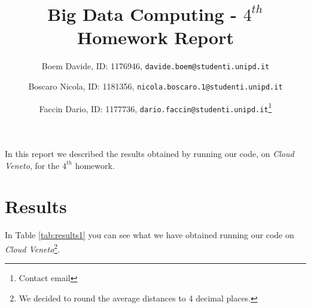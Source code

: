 \documentclass[10pt]{article}
\begin{document}
  
\title{Big Data Computing - $4^{th}$ Homework Report}
\author{Boem Davide, ID: 1176946, \texttt{davide.boem@studenti.unipd.it} \and Boscaro Nicola, ID: 1181356, \texttt{nicola.boscaro.1@studenti.unipd.it} \and Faccin Dario, ID: 1177736, \texttt{dario.faccin@studenti.unipd.it}\footnote{Contact email}}
\date{}
 
\maketitle

In this report we described the results obtained by running our code, on \textit{Cloud Veneto}, for the $4^{th}$ homework.

\section{Results}

In Table \ref{tab:results1} you can see what we have obtained running our code on \textit{Cloud Veneto}\footnote{We decided to round the average distances to 4 decimal places.}.
\end{document}
